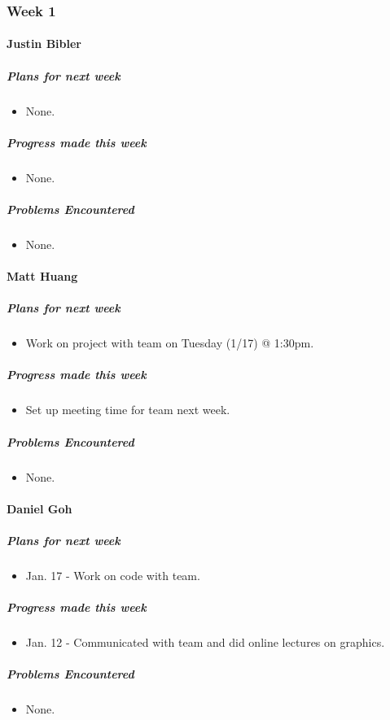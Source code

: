 {
\subsubsection{Week 1}
\paragraph{Justin Bibler}
\subparagraph{Plans for next week}
\begin{itemize}
  \item None.
\end{itemize}

\subparagraph{Progress made this week}
\begin{itemize}
  \item None.
\end{itemize}

\subparagraph{Problems Encountered}
\begin{itemize}
  \item None.
\end{itemize}
\vspace{3mm}

\paragraph{Matt Huang}
\subparagraph{Plans for next week}
\begin{itemize}
  \item Work on project with team on Tuesday (1/17) @ 1:30pm.
\end{itemize}

\subparagraph{Progress made this week}
\begin{itemize}
  \item Set up meeting time for team next week.
\end{itemize}

\subparagraph{Problems Encountered}
\begin{itemize}
  \item None.
\end{itemize}

\vspace{3mm}
\paragraph{Daniel Goh}
\subparagraph{Plans for next week}
\begin{itemize}
  \item Jan. 17 - Work on code with team.
\end{itemize}

\subparagraph{Progress made this week}
\begin{itemize}
  \item Jan. 12 - Communicated with team and did online lectures on graphics.
\end{itemize}

\subparagraph{Problems Encountered}
\begin{itemize}
  \item None.
\end{itemize}

}

